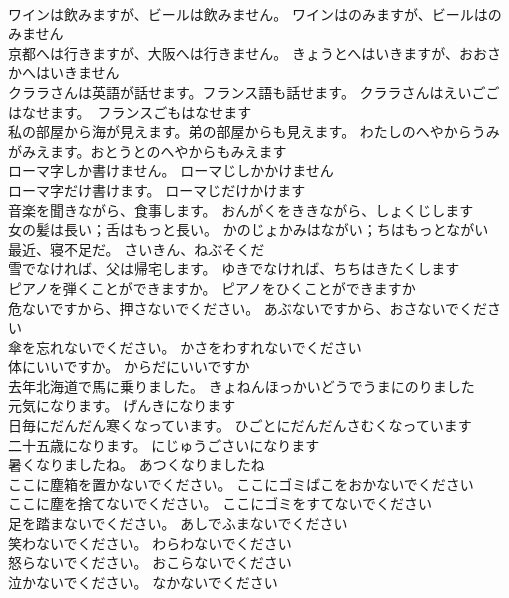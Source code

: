 \documentclass[8pt]{extreport}
\begin{document}
\begin{CJK}{UTF8}{min}
\\	ワインは飲みますが、ビールは飲みません。	ワインはのみますが、ビールはのみません 
\\	京都へは行きますが、大阪へは行きません。	きょうとへはいきますが、おおさかへはいきません 
\\	クララさんは英語が話せます。フランス語も話せます。	クララさんはえいごごはなせます。　フランスごもはなせます 
\\	私の部屋から海が見えます。弟の部屋からも見えます。	わたしのへやからうみがみえます。おとうとのへやからもみえます 
\\	ローマ字しか書けません。	ローマじしかかけません 
\\	ローマ字だけ書けます。	ローマじだけかけます 
\\	音楽を聞きながら、食事します。	おんがくをききながら、しょくじします 
\\	女の髪は長い；舌はもっと長い。	かのじょかみはながい；ちはもっとながい 
\\	最近、寝不足だ。	さいきん、ねぶそくだ 
\\	雪でなければ、父は帰宅します。	ゆきでなければ、ちちはきたくします 
\\	ピアノを弾くことができますか。	ピアノをひくことができますか 
\\	危ないですから、押さないでください。	あぶないですから、おさないでください 
\\	傘を忘れないでください。	かさをわすれないでください 
\\	体にいいですか。	からだにいいですか 
\\	去年北海道で馬に乗りました。	きょねんほっかいどうでうまにのりました 
\\	元気になります。	げんきになります 
\\	日毎にだんだん寒くなっています。	ひごとにだんだんさむくなっています 
\\	二十五歳になります。	にじゅうごさいになります 
\\	暑くなりましたね。	あつくなりましたね 
\\	ここに塵箱を置かないでください。	ここにゴミばこをおかないでください 
\\	ここに塵を捨てないでください。	ここにゴミをすてないでください 
\\	足を踏まないでください。	あしでふまないでください 
\\	笑わないでください。	わらわないでください 
\\	怒らないでください。	おこらないでください 
\\	泣かないでください。	なかないでください 

\end{CJK}
\end{document}
